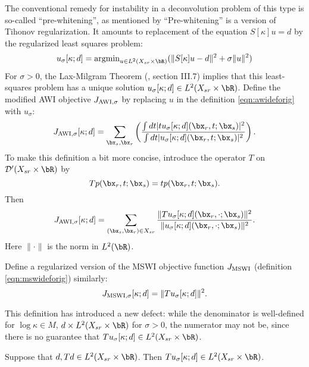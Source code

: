 The conventional remedy for instability in a deconvolution problem of
this type is so-called ``pre-whitening'', as
mentioned by \cite{Warner:16} ``Pre-whitening'' is a version of
Tihonov regularization. It  amounts to replacement of the equation
$S[\kappa]u=d$ by the regularized least squares problem: 
\begin{equation}
  \label{eqn:reg}
  u_{\sigma}[\kappa;d] = \mbox{argmin}_{u \in L^2(X_{sr} \times \bR)} (\|S[\kappa]u-d\|^2 + \sigma\|u\|^2)
\end{equation}
For $\sigma > 0$, the Lax-Milgram Theorem (\cite{Yosida}, section
III.7) implies that this least-squares problem has a unique solution
$u_{\sigma}[\kappa;d] \in L^2(X_{sr} \times \bR)$. Define the modified
AWI objective $J_{\rm AWI,\sigma}$ by
replacing $u$ in the definition \ref{eqn:awideforig} with $u_{\sigma}$:
\begin{equation}
  \label{eqn:awidef}
  J_{\rm AWI,\sigma}[\kappa;d] = \sum_{\bx_s,\bx_r} \left(\frac{\int dt |tu_{\sigma}[\kappa;d](\bx_r,t;\bx_s)|^2}{\int dt |u_{\sigma}[\kappa;d](\bx_r,t;\bx_s)|^2}\right). 
\end{equation}
To make this definition a bit more concise, introduce the operator $T$ on
${\cal D}'(X_{sr} \times \bR)$ by
\[
  Tp(\bx_r,t;\bx_s) = tp(\bx_r,t;\bx_s).
\]
Then
\begin{equation}
  \label{eqn:awidefbis}
  J_{\rm AWI,\sigma}[\kappa;d] = \sum_{(\bx_s,\bx_r) \in X_{sr}}
  \frac{\|Tu_{\sigma}[\kappa;d](\bx_r,\cdot;\bx_s)\|^2}{\|u_{\sigma}[\kappa;d](\bx_r,\cdot;\bx_s)\|^2}.
\end{equation}
Here $\| \cdot \|$ is the norm in $L^2(\bR)$.

Define a regularized version of the MSWI objective function $J_{\rm
  MSWI}$ (definition \ref{eqn:mswideforig}) similarly:
\begin{equation}
  \label{eqn:mswidef}
  J_{\rm MSWI,\sigma}[\kappa;d] = \|Tu_{\sigma}[\kappa;d]\|^2.
\end{equation}

This definition has introduced a new defect: while the denominator is
well-defined for $\log \kappa \in M$, $d \times L^2(X_{sr} \times
\bR)$ for $\sigma > 0$, the numerator may not be, since there is no
guarantee that $Tu_{\sigma}[\kappa;d] \in L^2(X_{sr} \times
\bR)$. 

\begin{prop}
  \label{thm:tl2}
  Suppose that $d, Td \in L^2(X_{sr} \times \bR)$. Then
  $Tu_{\sigma}[\kappa;d]  \in L^2(X_{sr} \times \bR)$.
\end{prop}

